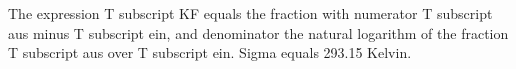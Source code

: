 The expression T subscript KF equals the fraction with numerator T subscript aus minus T subscript ein, and denominator the natural logarithm of the fraction T subscript aus over T subscript ein. Sigma equals 293.15 Kelvin.